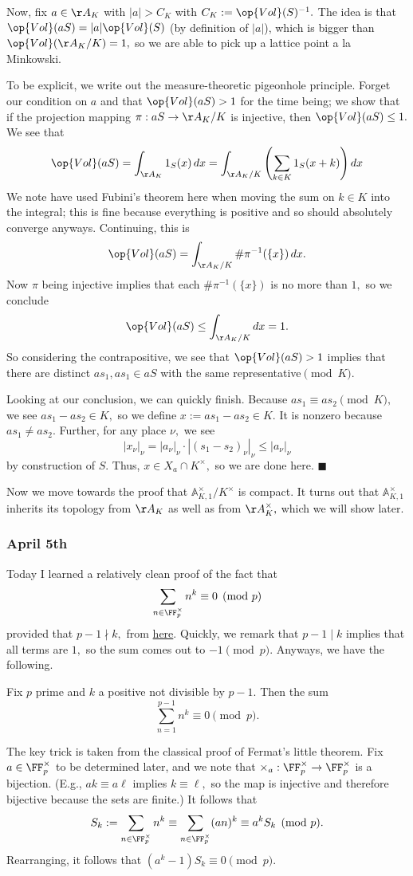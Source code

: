 Now, fix $a\in\AA_K$ with $|a|>C_K$ with $C_K:=\op{Vol}(S)^{-1}.$ The idea is that $\op{Vol}(aS)=|a|\op{Vol}(S)$ (by definition of $|a|$), which is bigger than $\op{Vol}(\AA_K/K)=1,$ so we are able to pick up a lattice point a la Minkowski.

To be explicit, we write out the measure-theoretic pigeonhole principle. Forget our condition on $a$ and that $\op{Vol}(aS)>1$ for the time being; we show that if the projection mapping $\pi:aS\to\AA_K/K$ is injective, then $\op{Vol}(aS)\le1.$ We see that
\[\op{Vol}(aS)=\int_{\AA_K}1_S(x)\,dx=\int_{\AA_K/K}\left(\sum_{k\in K}1_S(x+k)\right)dx\]
We note have used Fubini's theorem here when moving the sum on $k\in K$ into the integral; this is fine because everything is positive and so should absolutely converge anyways. Continuing, this is
\[\op{Vol}(aS)=\int_{\AA_K/K}\#\pi^{-1}(\{x\})\,dx.\]
Now $\pi$ being injective implies that each $\#\pi^{-1}(\{x\})$ is no more than $1,$ so we conclude
\[\op{Vol}(aS)\le\int_{\AA_K/K}dx=1.\]
So considering the contrapositive, we see that $\op{Vol}(aS)>1$ implies that there are distinct $as_1,as_1\in aS$ with the same representative$\pmod K.$

Looking at our conclusion, we can quickly finish. Because $as_1\equiv as_2\pmod K,$ we see $as_1-as_2\in K,$ so we define $x:=as_1-as_2\in K.$ It is nonzero because $as_1\ne as_2.$ Further, for any place $\nu,$ we see
\[|x_\nu|_\nu=|a_\nu|_\nu\cdot|(s_1-s_2)_\nu|_\nu\le|a_\nu|_\nu\]
by construction of $S.$ Thus, $x\in X_a\cap K^\times,$ so we are done here. $\blacksquare$

Now we move towards the proof that $\mathbb A^\times_{K,1}/K^\times$ is compact. It turns out that $\mathbb A^\times_{K,1}$ inherits its topology from $\AA_K$ as well as from $\AA_K^\times,$ which we will show later. \todo{}

\subsubsection{April 5th}
Today I learned a relatively clean proof of the fact that
\[\sum_{n\in\FF_p^\times}n^k\equiv0\pmod p\]
provided that $p-1\nmid k,$ from \href{https://web.archive.org/web/20210406035125/https://math.berkeley.edu/sites/default/files/pages/F08_Final_Exam-C.P.Mok_.pdf}{here}. Quickly, we remark that $p-1\mid k$ implies that all terms are $1,$ so the sum comes out to $-1\pmod p.$ Anyways, we have the following.
\begin{proposition}
    Fix $p$ prime and $k$ a positive not divisible by $p-1.$ Then the sum
    \[\sum_{n=1}^{p-1}n^k\equiv0\pmod p.\]
\end{proposition}
The key trick is taken from the classical proof of Fermat's little theorem. Fix $a\in\FF_p^\times$ to be determined later, and we note that $\times_a:\FF_p^\times\to\FF_p^\times$ is a bijection. (E.g., $ak\equiv a\ell$ implies $k\equiv\ell,$ so the map is injective and therefore bijective because the sets are finite.) It follows that
\[S_k:=\sum_{n\in\FF_p^\times}n^k\equiv\sum_{n\in\FF_p^\times}(an)^k\equiv a^kS_k\pmod p.\]
Rearranging, it follows that $\left(a^k-1\right)S_k\equiv0\pmod p.$

